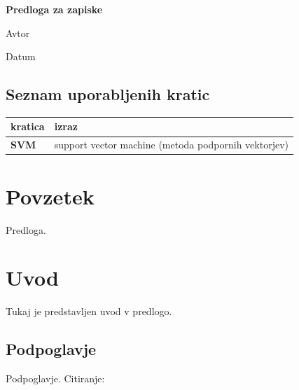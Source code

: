 \documentclass[a4paper, 12pt]{book}
\title{\ttitle}
\author{\tauthor}
\date{\tdate}
\newcommand{\ttitle}{Predloga za zapiske}
\newcommand{\tauthor}{Avtor}
\newcommand{\tdate}{Datum}
\theoremstyle{definition}
\theoremstyle{remark}
\newcommand\mymaketitle{
  \begin{titlepage}
    \begin{center}
        \vspace*{4cm}
        \Huge
        \textbf{\ttitle}
                        
        \vspace{1.5cm}
        \huge
        \tauthor
            
        \vspace{3cm}
        \Large
        \tdate
    \end{center}
  \end{titlepage}
}
\begin{document}
\renewcommand{\thepage}{}
\newcommand{\sn}[1]{"`#1"'}

\mymaketitle

\clearpage

\frontmatter

\pagestyle{empty}
\def\thepage{}
\tableofcontents{}

\def\x{\hspace{3ex}}    %
\def\y{\hspace{2.45ex}}  %
\def\z{\hspace{1.9ex}}    %
\stackMath

\clearpage
{}

\section*{Seznam uporabljenih kratic}

\noindent\begin{tabular}{p{}|p{}}
  {\bf kratica} & {\bf izraz} \\ \hline
  {\bf SVM}   & support vector machine (metoda podpornih vektorjev) \\
\end{tabular}

\clearpage
{}
{}
\chapter*{Povzetek}

Predloga.



\mainmatter
\setcounter{page}{1}
\pagestyle{fancy}

\chapter{Uvod}

Tukaj je predstavljen uvod v predlogo.


\section{Podpoglavje}

Podpoglavje. Citiranje: \cite{lamport1985latex}
\end{document}
